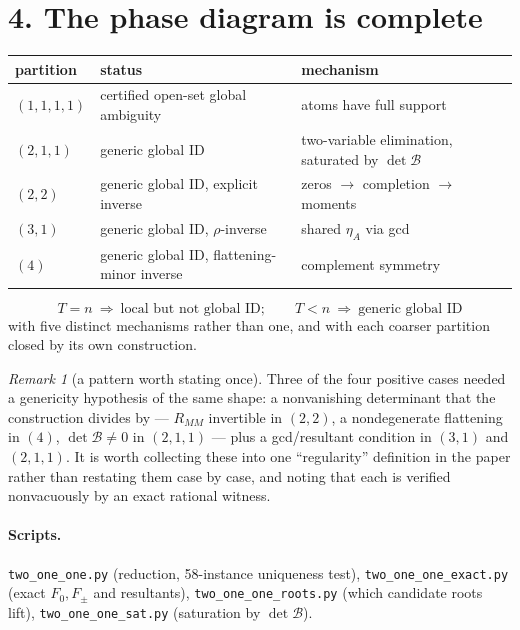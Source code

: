 \documentclass[11pt]{article}
\theoremstyle{remark}
\newtheorem*{remark}{Remark}
\begin{document}
\section*{4. The phase diagram is complete}

\begin{center}\small
\begin{tabular}{@{}lll@{}}
\toprule
partition & status & mechanism\\
\midrule
$(1,1,1,1)$ & certified open-set global ambiguity & atoms have full support\\
$(2,1,1)$ & generic global ID & two-variable elimination, saturated by $\det\mathcal B$\\
$(2,2)$ & generic global ID, explicit inverse & zeros $\to$ completion $\to$ moments\\
$(3,1)$ & generic global ID, $\rho$-inverse & shared $\eta_A$ via gcd\\
$(4)$ & generic global ID, flattening-minor inverse & complement symmetry\\
\bottomrule
\end{tabular}
\end{center}

\[
\boxed{T=n\ \Rightarrow\ \text{local but not global ID};\qquad T<n\ \Rightarrow\ \text{generic global ID}}
\]
with five distinct mechanisms rather than one, and with each coarser partition closed by its own construction.

\begin{remark}[a pattern worth stating once]
Three of the four positive cases needed a genericity hypothesis of the same shape: a nonvanishing determinant that the construction divides by --- $R_{MM}$ invertible in $(2,2)$, a nondegenerate flattening in $(4)$, $\det\mathcal B\neq0$ in $(2,1,1)$ --- plus a gcd/resultant condition in $(3,1)$ and $(2,1,1)$. It is worth collecting these into one ``regularity'' definition in the paper rather than restating them case by case, and noting that each is verified nonvacuously by an exact rational witness.
\end{remark}

\paragraph{Scripts.} \texttt{two\_one\_one.py} (reduction, 58-instance uniqueness test), \texttt{two\_one\_one\_exact.py} (exact $F_0,F_\pm$ and resultants), \texttt{two\_one\_one\_roots.py} (which candidate roots lift), \texttt{two\_one\_one\_sat.py} (saturation by $\det\mathcal B$).
\end{document}
